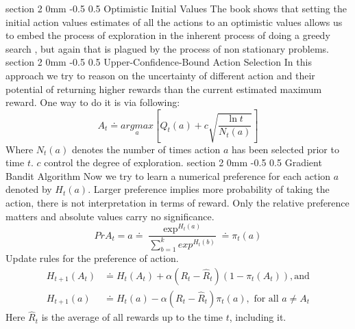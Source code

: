 \documentclass[twocolumn,11pt]{article}
\makeatletter
\renewcommand{\section}{\@startsection
{section}%
{2}%
{0mm}%
{-0.5\baselineskip}%
{0.5\baselineskip}%
{\bfseries\color{blue}}} %
\makeatother
\begin{document}
\section{Optimistic Initial Values}
The book \cite{sutton2018reinforcement} shows that setting the initial action values estimates of all the actions to an optimistic values allows us to embed the process of exploration in the inherent process of doing a greedy search , but again that is plagued by the process of non stationary problems.
\section{Upper-Confidence-Bound Action Selection }
In this approach we try to reason on the uncertainty of different action and their potential of returning higher rewards than the current estimated maximum reward. One way to do it is via following:\useshortskip
\begin{equation}
    A_t \doteq \underset{a}{argmax}[Q_t(a) + c\sqrt{\dfrac{\ln{t}}{N_t(a)}}]
\end{equation}
Where $N_t(a)$ denotes the number of times action $a$ has been selected prior to time $t$. $c $ control the degree of exploration.
\section{Gradient Bandit Algorithm}
Now we try to learn a numerical preference for each action $a$ denoted by $H_t(a)$. Larger preference implies more probability of taking the action, there is not interpretation in terms of reward. Only the relative preference matters and absolute values carry no significance. 
\begin{equation}
    Pr{A_t = a} \doteq \dfrac{\exp^{H_t(a)}}{\sum_{b=1 }^{k}exp^{H_t(b)}} \doteq \pi_t(a)
\end{equation}
Update rules for the preference of action.
\begin{equation}
    \begin{split}
        H_{t+1}(A_t) &\doteq H_t (A_t) + \alpha(R_t - \hat{R}_t)(1 - \pi_t(A_t)), \text{and}\\
        H_{t+1}(a) &\doteq H_t(a) - \alpha(R_t - \hat{R}_t)\pi_t(a), \text{ for all $a \neq A_t$}
    \end{split}
\end{equation}
Here $\hat{R}_t$ is the average of all rewards up to the time $t$, including it. 








\end{document}
